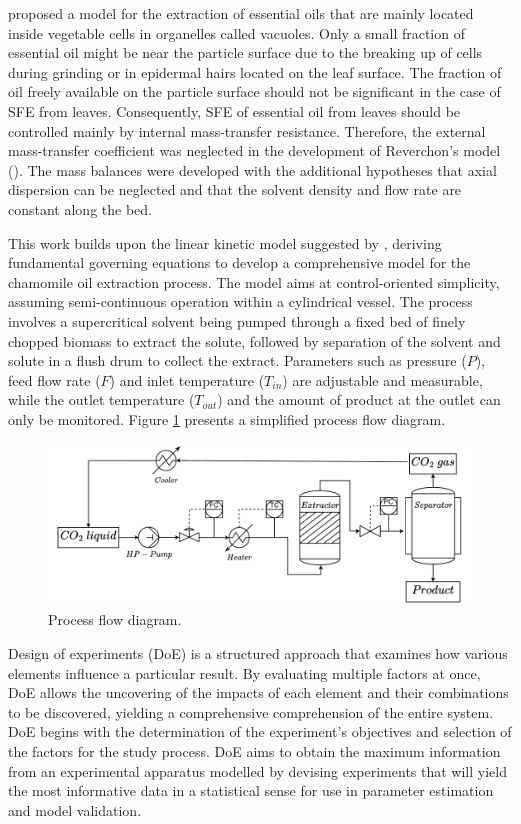 \documentclass[a4paper,fleqn]{cas-dc}
\begin{document}
\citet{Reverchon1996} proposed a model for the extraction of essential oils that are mainly located inside vegetable cells in organelles called vacuoles. Only a small fraction of essential oil might be near the particle surface due to the breaking up of cells during grinding or in epidermal hairs located on the leaf surface. The fraction of oil freely available on the particle surface should not be significant in the case of SFE from leaves. Consequently, SFE of essential oil from leaves should be controlled mainly by internal mass-transfer resistance. Therefore, the external mass-transfer coefficient was neglected in the development of Reverchon's model (\citet{Reverchon1996}). The mass balances were developed with the additional hypotheses that axial dispersion can be neglected and that the solvent density and flow rate are constant along the bed.

This work builds upon the linear kinetic model suggested by \citet{Reverchon1996}, deriving fundamental governing equations to develop a comprehensive model for the chamomile oil extraction process. The model aims at control-oriented simplicity, assuming semi-continuous operation within a cylindrical vessel. The process involves a supercritical solvent being pumped through a fixed bed of finely chopped biomass to extract the solute, followed by separation of the solvent and solute in a flush drum to collect the extract. Parameters such as pressure ($P$), feed flow rate ($F$) and inlet temperature ($T_{in}$) are adjustable and measurable, while the outlet temperature ($T_{out}$) and the amount of product at the outlet can only be monitored. Figure \ref{fig: SFE_drawing} presents a simplified process flow diagram.

\begin{figure}[h!]
	\centering
	\includegraphics[width=\columnwidth]{Figures/PFD.drawio.pdf}
	\caption{Process flow diagram.}
	\label{fig: SFE_drawing}
\end{figure}

%
Design of experiments (DoE) is a structured approach that examines how various elements influence a particular result. By evaluating multiple factors at once, DoE allows the uncovering of the impacts of each element and their combinations to be discovered, yielding a comprehensive comprehension of the entire system. DoE begins with the determination of the experiment's objectives and selection of the factors for the study process. DoE aims to obtain the maximum information from an experimental apparatus modelled by devising experiments that will yield the most informative data in a statistical sense for use in parameter estimation and model validation. 
\end{document}

